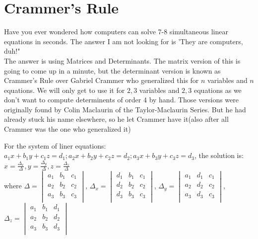 \section{Crammer's Rule}
Have you ever wondered how computers can solve 7-8 simultaneous linear equations in seconds. The answer I am not looking for is 'They are computers, duh!"\\
The answer is using Matrices and Determinants. The matrix version of this is going to come up in a minute, but the determinant version is known as Crammer's Rule over Gabriel Crammer who generalized this for $n$ variables and $n$ equations. We will only get to use it for $2,3$ variables and $2,3$ equations as we don't want to compute determinents of order 4 by hand. Those versions were originally found by Colin Maclaurin  of the Taylor-Maclaurin Series. But he had already stuck his name elsewhere, so he let Crammer have it(also after all Crammer was the one who generalized it)\\
\begin{theorem}
    For the system of liner equations: $a_1x+b_1y+c_1z=d_1;a_2x+b_2y+c_2z=d_2;a_3x+b_3y+c_3z=d_3$, the solution is: $x=\frac{\Delta_x}{\Delta}, y=\frac{\Delta_y}{\Delta}, z=\frac{\Delta_z}{\Delta}$\\
    where $\Delta= \begin{vmatrix}
        a_1 & b_1 & c_1 \\
        a_2 & b_2 & c_2 \\
        a_3 & b_3 & c_3 \\
    \end{vmatrix}$, $\Delta_x = \begin{vmatrix}
        d_1 & b_1 & c_1 \\
        d_2 & b_2 & c_2 \\
        d_3 & b_3 & c_3 \\
    \end{vmatrix}$, $\Delta_y= \begin{vmatrix}
        a_1 & d_1 & c_1 \\
        a_2 & d_2 & c_2 \\
        a_3 & d_3 & c_3 \\
    \end{vmatrix}$, $\Delta_z= \begin{vmatrix}
        a_1 & b_1 & d_1 \\
        a_2 & b_2 & d_2 \\
        a_3 & b_3 & d_3 \\
    \end{vmatrix}$
\end{theorem}
